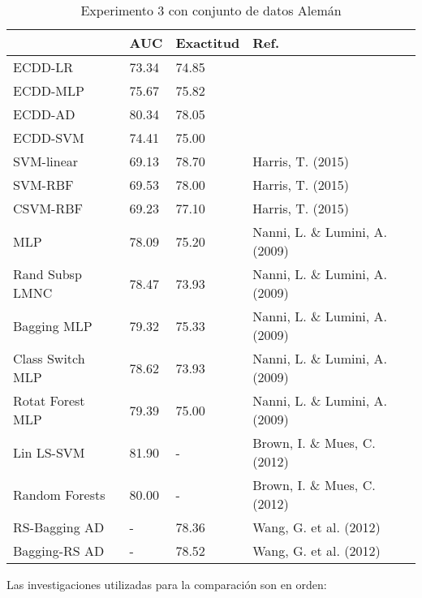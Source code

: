 \begin{table}[]
\centering
\caption{Experimento 3 con conjunto de datos Alemán}
\label{tab:german-proc3}
\begin{tabularx}{\textwidth}{|l|Y Y l|}
						\hline
						& AUC		& Exactitud	& Ref.									\\
						\hline
ECDD-LR					& 73.34		& 74.85		&										\\		%
ECDD-MLP				& 75.67		& 75.82		&										\\		%
ECDD-AD					& 80.34		& 78.05		&										\\		%
ECDD-SVM				& 74.41		& 75.00		&										\\		%
						\hline
SVM-linear				& 69.13		& 78.70		& Harris, T. (2015)						\\
SVM-RBF					& 69.53		& 78.00		& Harris, T. (2015)						\\
CSVM-RBF				& 69.23		& 77.10		& Harris, T. (2015)						\\
MLP						& 78.09		& 75.20		& Nanni, L. \& Lumini, A. (2009)		\\
Rand Subsp LMNC			& 78.47		& 73.93		& Nanni, L. \& Lumini, A. (2009)		\\
Bagging MLP				& 79.32		& 75.33		& Nanni, L. \& Lumini, A. (2009)		\\
Class Switch MLP		& 78.62		& 73.93		& Nanni, L. \& Lumini, A. (2009)		\\
Rotat Forest MLP		& 79.39		& 75.00		& Nanni, L. \& Lumini, A. (2009)		\\
Lin LS-SVM				& 81.90		& -			& Brown, I. \& Mues, C. (2012)			\\
Random Forests			& 80.00		& -			& Brown, I. \& Mues, C. (2012)			\\
RS-Bagging AD			& -			& 78.36		& Wang, G. et al. (2012)				\\
Bagging-RS AD			& -			& 78.52		& Wang, G. et al. (2012)				\\
						\hline
\end{tabularx}
\par
\small
Las investigaciones utilizadas para la comparación son en orden: \citep{harris2015credit, nanni2009experimental, brown2012experimental, wang2012two}
\end{table}

